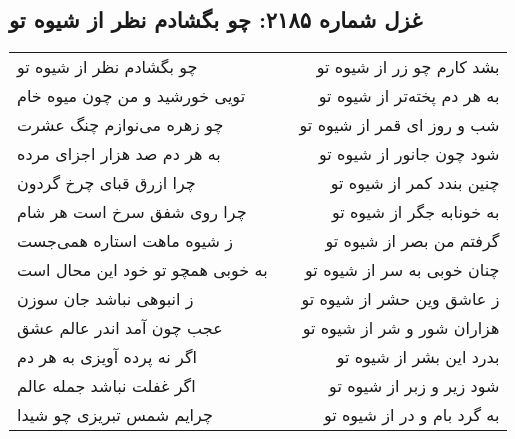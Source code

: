 \begin{center}
\section*{غزل شماره ۲۱۸۵: چو بگشادم نظر از شیوه تو}
\label{sec:2185}
\begin{longtable}{l p{0.5cm} r}
چو بگشادم نظر از شیوه تو
&&
بشد کارم چو زر از شیوه تو
\\
تویی خورشید و من چون میوه خام
&&
به هر دم پخته‌تر از شیوه تو
\\
چو زهره می‌نوازم چنگ عشرت
&&
شب و روز ای قمر از شیوه تو
\\
به هر دم صد هزار اجزای مرده
&&
شود چون جانور از شیوه تو
\\
چرا ازرق قبای چرخ گردون
&&
چنین بندد کمر از شیوه تو
\\
چرا روی شفق سرخ است هر شام
&&
به خونابه جگر از شیوه تو
\\
ز شیوه ماهت استاره همی‌جست
&&
گرفتم من بصر از شیوه تو
\\
به خوبی همچو تو خود این محال است
&&
چنان خوبی به سر از شیوه تو
\\
ز انبوهی نباشد جان سوزن
&&
ز عاشق وین حشر از شیوه تو
\\
عجب چون آمد اندر عالم عشق
&&
هزاران شور و شر از شیوه تو
\\
اگر نه پرده آویزی به هر دم
&&
بدرد این بشر از شیوه تو
\\
اگر غفلت نباشد جمله عالم
&&
شود زیر و زبر از شیوه تو
\\
چرایم شمس تبریزی چو شیدا
&&
به گرد بام و در از شیوه تو
\\
\end{longtable}
\end{center}
